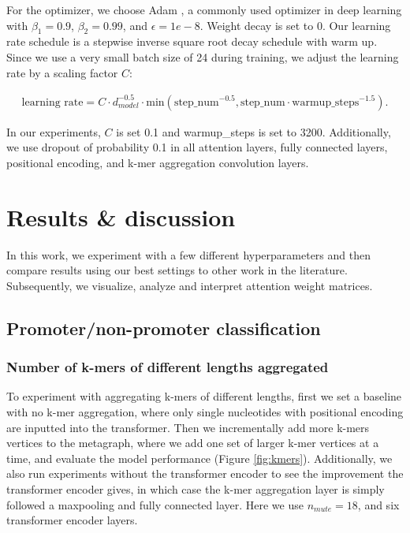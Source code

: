 \documentclass{article}
\begin{document}
For the optimizer, we choose Adam \cite{adampaper}, a commonly used optimizer in deep learning with $\beta_1=0.9$, $\beta_2=0.99$, and $\epsilon=1e-8$. Weight decay is set to 0. Our learning rate schedule is a stepwise inverse square root decay schedule with warm up. Since we use a very small batch size of 24 during training, we adjust the learning rate by a scaling factor $C$:

\begin{align}
\text{learning rate}= C\cdot d_{model}^{-0.5}\cdot \text{min}(\text{step\_num}^{-0.5},\text{step\_num}\cdot \text{warmup\_steps}^{-1.5}).
\end{align}

In our experiments, $C$ is set 0.1 and warmup\_steps is set to 3200. Additionally, we use dropout \cite{dropoutpaper} of probability 0.1 in all attention layers, fully connected layers, positional encoding, and k-mer aggregation convolution layers.


\section{Results \& discussion}
In this work, we experiment with a few different hyperparameters and then compare results using our best settings to other work in the literature. Subsequently, we visualize, analyze and interpret attention weight matrices.



\subsection{Promoter/non-promoter classification}
\subsubsection{Number of k-mers of different lengths aggregated}
To experiment with aggregating k-mers of different lengths, first we set a baseline with no k-mer aggregation, where only single nucleotides with positional encoding are inputted into the transformer. Then we incrementally add more k-mers vertices to the metagraph, where we add one set of larger k-mer vertices at a time, and evaluate the model performance (Figure \ref{fig:kmers}). Additionally, we also run experiments without the transformer encoder to see the improvement the transformer encoder gives, in which case the k-mer aggregation layer is simply followed a maxpooling and fully connected layer. Here we use $n_{mute}=18$, and six transformer encoder layers.
\end{document}
